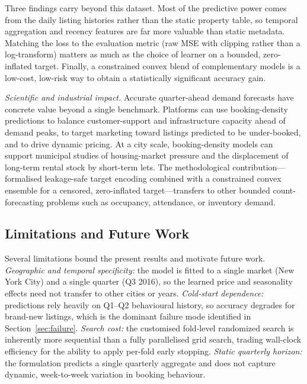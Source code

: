 \documentclass[journal]{IEEEtran}
\begin{document}
Three findings carry beyond this dataset. Most of the predictive power comes from
the daily listing histories rather than the static property table, so temporal
aggregation and recency features are far more valuable than static metadata.
Matching the loss to the evaluation metric (raw MSE with clipping rather than a
log-transform) matters as much as the choice of learner on a bounded,
zero-inflated target. Finally, a constrained convex blend of complementary models
is a low-cost, low-risk way to obtain a statistically significant accuracy gain.

\emph{Scientific and industrial impact.} Accurate quarter-ahead demand
forecasts have concrete value beyond a single benchmark. Platforms can use
booking-density predictions to balance customer-support and infrastructure
capacity ahead of demand peaks, to target marketing toward listings predicted to
be under-booked, and to drive dynamic pricing. At a city scale, booking-density
models can support municipal studies of housing-market pressure and the
displacement of long-term rental stock by short-term lets. The methodological
contribution---formalised leakage-safe target encoding combined with a
constrained convex ensemble for a censored, zero-inflated target---transfers to
other bounded count-forecasting problems such as occupancy, attendance, or
inventory demand.

\subsection{Limitations and Future Work}
\label{sec:limitations}
Several limitations bound the present results and motivate future work.
\emph{Geographic and temporal specificity:} the model is fitted to a single
market (New York City) and a single quarter (Q3 2016), so the learned price and
seasonality effects need not transfer to other cities or years.
\emph{Cold-start dependence:} predictions rely heavily on Q1--Q2 behavioural
history, so accuracy degrades for brand-new listings, which is the dominant
failure mode identified in Section~\ref{sec:failure}.
\emph{Search cost:} the customised fold-level randomized search is inherently
more sequential than a fully parallelised grid search, trading wall-clock
efficiency for the ability to apply per-fold early stopping.
\emph{Static quarterly horizon:} the formulation predicts a single quarterly
aggregate and does not capture dynamic, week-to-week variation in booking
behaviour.
\end{document}
